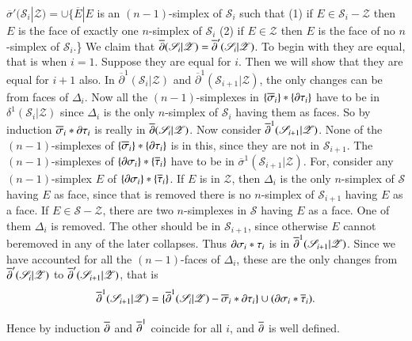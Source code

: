 $\overline{\sigma}'(\mathscr{S}_{i}|\mathscr{Z})=\cup \{\overline{E}|E$ is an $(n-1)$-simplex of $\mathscr{S}_{i}$ such that (1) if $E\in \mathscr{S}_{i}-\mathscr{Z}$ then $E$ is the face of exactly one $n$-simplex of $\mathscr{S}_{i}$ (2) if $E\in \mathscr{Z}$ then $E$ is the face of no $n$-simplex of $\mathscr{S}_{i}$.\} We claim that $\overline{\partial}(\mathscr{S}_{i}|\mathscr{Z})=\overline{\partial}'(\mathscr{S}_{i}|\mathscr{Z})$. To begin with they are equal, that is when $i=1$. Suppose they are equal for $i$. Then we will show that they are equal for $i+1$ also. In ${\overline{\partial}}^{1}(\mathscr{S}_{i}|\mathscr{Z})$ and ${\overline{\partial}}^1(\mathscr{S}_{i+1}|\mathscr{Z})$, the only changes can be from faces of $\Delta_{i}$. Now all the $(n-1)$-simplexes in $\{\overline{\sigma}_{i}\}\ast \{\partial \tau_{i}\}$ have to be in $\delta^{1}(\mathscr{S}_{i}|\mathscr{Z})$ since $\Delta_{i}$ is the only $n$-simplex of $\mathscr{S}_{i}$ having them as faces. So by induction 
$\overline{\sigma}_{i}\ast\partial \tau_{i}$ is really in $\overline{\partial}(\mathscr{S}_{i}|\mathscr{Z})$. Now consider $\overline{\partial}^{1}(\mathscr{S}_{i+1}|\mathscr{Z})$. None of the $(n-1)$-simplexes of $\{\overline{\sigma}_{i}\}\ast \{\partial \tau_{i}\}$ is in this, since they are not in $\mathscr{S}_{i+1}$. The $(n-1)$-simplexes of $\{\partial \sigma_{i}\}\ast\{\overline{\tau}_{i}\}$ have to be in $\overline{\sigma}^{1}(\mathscr{S}_{i+1}|\mathscr{Z})$. For, consider any $(n-1)$-simplex $E$ of $\{\partial \sigma_{i}\}\ast\{\overline{\tau}_{i}\}$. If $E$ is in $\mathscr{Z}$, then $\Delta_{i}$ is the only $n$-simplex of $\mathscr{S}$ having $E$ as face, since that is removed there is no $n$-simplex of $\mathscr{S}_{i+1}$ having $E$ as a face. If $E\in \mathscr{S}-\mathscr{Z}$, there are two $n$-simplexes in $\mathscr{S}$ having $E$ as a face. One of them $\Delta_{i}$ is removed. The other should be in $\mathscr{S}_{i+1}$, since otherwise $E$ cannot be\pageoriginale removed in any of the later collapses. Thus $\partial \sigma_{i}\ast\tau_{i}$ is in 
$\overline{\partial}^1(\mathscr{S}_{i+1}|\mathscr{Z})$. Since we have accounted for all the $(n-1)$-faces of $\Delta_{i}$, these are the only changes from $\overline{\partial}'(\mathscr{S}_{i}|\mathscr{Z})$ to $\overline{\partial}'(\mathscr{S}_{i+1}|\mathscr{Z})$, that is
$$
\overline{\partial}^{1}(\mathscr{S}_{i+1}|\mathscr{Z})=\{\overline{\partial}^{1}(\mathscr{S}_{i}|\mathscr{Z})-\overline{\sigma}_{i}\ast\partial \tau_{i}\}\cup (\partial \sigma_{i}\ast\overline{\tau}_{i}).
$$

Hence by induction $\overline{\partial}$ and $\overline{\partial}^{1}$ coincide for all $i$, and $\overline{\partial}$ is well defined.

